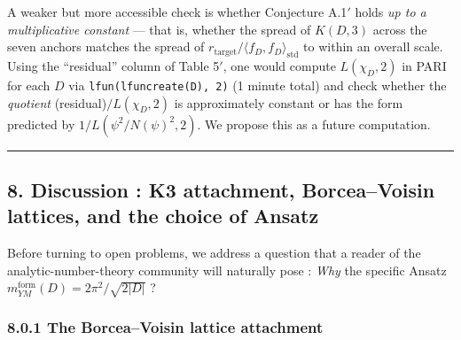 \documentclass[
  11pt,
  a4paper,
]{amsart}
\begin{document}
A weaker but more accessible check is whether Conjecture A.1\('\) holds \emph{up to a multiplicative constant} --- that is, whether the spread of \(K(D, 3)\) across the seven anchors matches the spread of \(r_{\mathrm{target}}/\langle f_D, f_D\rangle_{\mathrm{std}}\) to within an overall scale. Using the ``residual'' column of Table 5\('\), one would compute \(L(\chi_D, 2)\) in PARI for each \(D\) via \texttt{lfun(lfuncreate(D),\ 2)} (1 minute total) and check whether the \emph{quotient} (residual)\(/L(\chi_D, 2)\) is approximately constant or has the form predicted by \(1/L(\psi^{2}/N(\psi)^{2}, 2)\). We propose this as a future computation.

\begin{center}\rule{0.5\linewidth}{0.5pt}\end{center}

\hypertarget{discussion-k3-attachment-borceavoisin-lattices-and-the-choice-of-ansatz}{%
\subsection{8. Discussion : K3 attachment, Borcea--Voisin lattices, and the choice of Ansatz}\label{discussion-k3-attachment-borceavoisin-lattices-and-the-choice-of-ansatz}}

Before turning to open problems, we address a question that a reader of the analytic-number-theory community will naturally pose : \emph{Why} the specific Ansatz \(m_{YM}^{\mathrm{form}}(D) = 2\pi^{2}/\sqrt{2|D|}\) ?

\hypertarget{the-borceavoisin-lattice-attachment}{%
\subsubsection{8.0.1 The Borcea--Voisin lattice attachment}\label{the-borceavoisin-lattice-attachment}}
\end{document}
